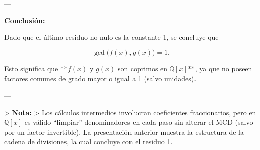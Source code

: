 ---

\textbf{Conclusión:}

Dado que el último residuo no nulo es la constante 1, se concluye que

\[
\boxed{\gcd\bigl(f(x),g(x)\bigr)= 1.}
\]

Esto significa que **\(f(x)\) y \(g(x)\) son coprimos en \(\mathbb{Q}[x]\)**, ya que no poseen factores comunes de grado mayor o igual a 1 (salvo unidades).

---

> \textbf{Nota:}  
> Los cálculos intermedios involucran coeficientes fraccionarios, pero en \(\mathbb{Q}[x]\) es válido “limpiar” denominadores en cada paso sin alterar el MCD (salvo por un factor invertible). La presentación anterior muestra la estructura de la cadena de divisiones, la cual concluye con el residuo 1.
